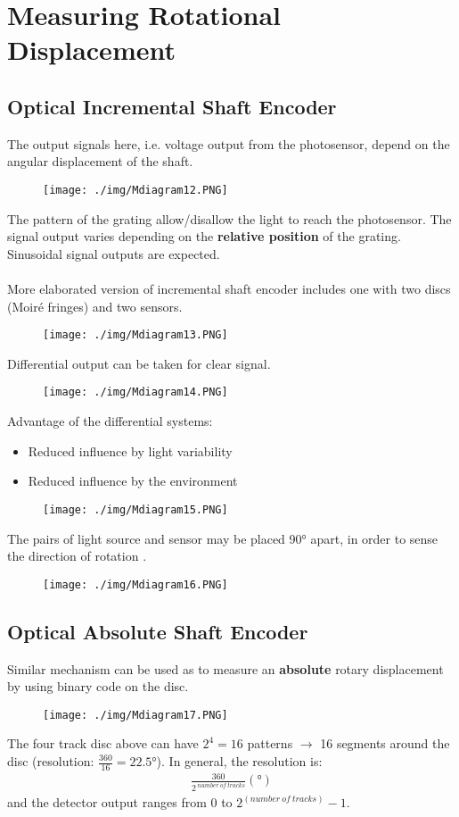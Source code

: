 \section{Measuring Rotational Displacement}
\subsection{Optical Incremental Shaft Encoder}
The output signals here, i.e. voltage output from the photosensor, depend on the angular displacement of the shaft.
\begin{figure}[H]
  \centering
  \texttt{[image: ./img/Mdiagram12.PNG]}
\end{figure}
The pattern of the grating allow/disallow the light to reach the photosensor. The signal output varies depending on the \textbf{relative position} of the grating. Sinusoidal signal outputs are expected. \\\\
More elaborated version of incremental shaft encoder includes one with two discs (Moiré fringes) and two sensors.
\begin{figure}[H]
  \centering
  \texttt{[image: ./img/Mdiagram13.PNG]}
\end{figure}
Differential output can be taken for clear signal.
\begin{figure}[H]
  \centering
  \texttt{[image: ./img/Mdiagram14.PNG]}
\end{figure}
Advantage of the differential systems:
\begin{itemize}
  \item Reduced influence by light variability
  \item Reduced influence by the environment
\end{itemize}
\begin{figure}[H]
  \centering
  \texttt{[image: ./img/Mdiagram15.PNG]}
\end{figure}
The pairs of light source and sensor may be placed 90\si{\degree} apart, in order to sense the direction of rotation .
\begin{figure}[H]
  \centering
  \texttt{[image: ./img/Mdiagram16.PNG]}
\end{figure}
\subsection{Optical Absolute Shaft Encoder}
Similar mechanism can be used as to measure an \textbf{absolute} rotary displacement by using binary code on the disc.
\begin{figure}[H]
  \centering
  \texttt{[image: ./img/Mdiagram17.PNG]}
\end{figure}
The four track disc above can have $2^4 = 16$ patterns $\longrightarrow$ 16 segments around the disc (resolution: $\frac{360}{16} = 22.5$\si{\degree}). In general, the resolution is:
\begin{gather}
  \frac{360}{2^{\ number \ of \ tracks}}(\si{\degree})
\end{gather}
and the detector output ranges from 0 to $2^{(number \ of \ tracks)}-1$.
